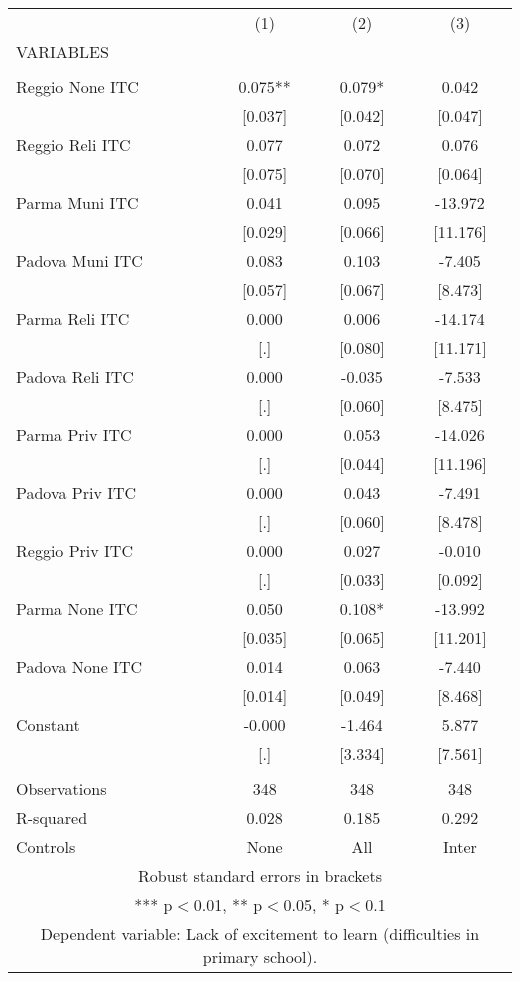 \begin{tabular}{lccc} \hline
 & (1) & (2) & (3) \\
VARIABLES &  &  &  \\ \hline
 &  &  &  \\
Reggio None ITC & 0.075** & 0.079* & 0.042 \\
 & [0.037] & [0.042] & [0.047] \\
Reggio Reli ITC & 0.077 & 0.072 & 0.076 \\
 & [0.075] & [0.070] & [0.064] \\
Parma Muni ITC & 0.041 & 0.095 & -13.972 \\
 & [0.029] & [0.066] & [11.176] \\
Padova Muni ITC & 0.083 & 0.103 & -7.405 \\
 & [0.057] & [0.067] & [8.473] \\
Parma Reli ITC & 0.000 & 0.006 & -14.174 \\
 & [.] & [0.080] & [11.171] \\
Padova Reli ITC & 0.000 & -0.035 & -7.533 \\
 & [.] & [0.060] & [8.475] \\
Parma Priv ITC & 0.000 & 0.053 & -14.026 \\
 & [.] & [0.044] & [11.196] \\
Padova Priv ITC & 0.000 & 0.043 & -7.491 \\
 & [.] & [0.060] & [8.478] \\
Reggio Priv ITC & 0.000 & 0.027 & -0.010 \\
 & [.] & [0.033] & [0.092] \\
Parma None ITC & 0.050 & 0.108* & -13.992 \\
 & [0.035] & [0.065] & [11.201] \\
Padova None ITC & 0.014 & 0.063 & -7.440 \\
 & [0.014] & [0.049] & [8.468] \\
Constant & -0.000 & -1.464 & 5.877 \\
 & [.] & [3.334] & [7.561] \\
 &  &  &  \\
Observations & 348 & 348 & 348 \\
R-squared & 0.028 & 0.185 & 0.292 \\
 Controls & None & All & Inter \\ \hline
\multicolumn{4}{c}{ Robust standard errors in brackets} \\
\multicolumn{4}{c}{ *** p$<$0.01, ** p$<$0.05, * p$<$0.1} \\
\multicolumn{4}{c}{ Dependent variable: Lack of excitement to learn (difficulties in primary school).} \\
\end{tabular}
